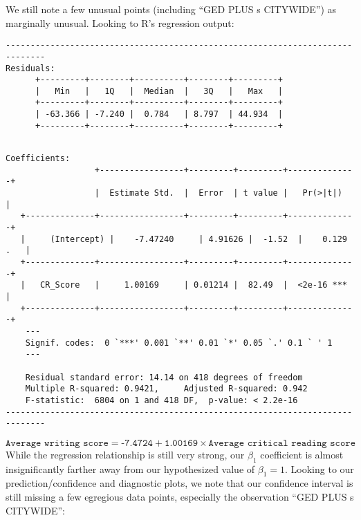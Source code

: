 \documentclass[11pt]{article} %
\begin{document}
We still note a few unusual points (including ``GED PLUS s CITYWIDE'') as marginally unusual. Looking to \textsc{R}'s regression output:

\begin{verbatim}
------------------------------------------------------------------------------
Residuals:
	  +---------+--------+----------+--------+---------+  
	  |   Min   |   1Q   |  Median  |   3Q   |   Max   |
	  +---------+--------+----------+--------+---------+  
	  | -63.366 | -7.240 |  0.784   | 8.797  | 44.934  |
	  +---------+--------+----------+--------+---------+ 
	
\end{verbatim}

\newpage
\begin{verbatim}
Coefficients:
                  +-----------------+---------+---------+--------------+
                  |  Estimate Std.  |  Error  | t value |   Pr(>|t|)   |
   +--------------+-----------------+---------+---------+--------------+
   |	 (Intercept) |    -7.47240     | 4.91626 |  -1.52  |    0.129 .   |
   +--------------+-----------------+---------+---------+--------------+
   |   CR_Score   |     1.00169     | 0.01214 |  82.49  |  <2e-16 ***  |
   +--------------+-----------------+---------+---------+--------------+
    ---
    Signif. codes:  0 `***' 0.001 `**' 0.01 `*' 0.05 `.' 0.1 ` ' 1
    ---
	
	Residual standard error: 14.14 on 418 degrees of freedom
	Multiple R-squared: 0.9421,	    Adjusted R-squared: 0.942
	F-statistic:  6804 on 1 and 418 DF,  p-value: < 2.2e-16
------------------------------------------------------------------------------
\end{verbatim}
\[ \texttt{Average writing score} = \texttt{-7.4724} + \texttt{1.00169} \times \texttt{Average critical reading score} \]
While the regression relationship is still very strong, our $\beta_1$ coefficient is almost insignificantly farther away from our hypothesized value of $\beta_1 = 1$. Looking to our prediction/confidence and diagnostic plots, we note that our confidence interval is still missing a few egregious data points, especially the observation ``GED PLUS s CITYWIDE'':

\end{document}
